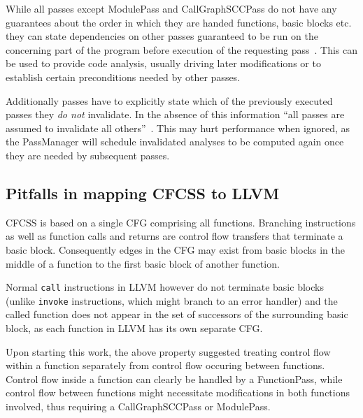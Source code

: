 While all passes except ModulePass and
CallGraphSCCPass do not have any guarantees about the order in which they are
handed functions, basic blocks etc. they can state dependencies on other passes
guaranteed to be run on the concerning part of the program before execution of
the requesting pass~\cite[Specifying interactions between
passes]{writing-passes}. This can be used to provide code analysis, usually
driving later modifications or to establish certain preconditions needed by
other passes.

Additionally passes have to explicitly state which of the previously executed
passes they \emph{do not} invalidate. In the absence of this information “all
passes are assumed to invalidate all others”~\cite[Specifying interactions
between passes]{writing-passes}. This may hurt performance when ignored, as the
PassManager will schedule invalidated analyses to be computed again once they
are needed by subsequent passes.


\subsection{Pitfalls in mapping CFCSS to LLVM}

CFCSS is based on a single CFG comprising all functions. Branching instructions
as well as function calls and returns are control flow transfers that terminate
a basic block. Consequently edges in the CFG may exist from basic blocks in the
middle of a function to the first basic block of another function.

Normal \texttt{call} instructions in LLVM however do not terminate basic
blocks~\cite{terminatorinst} (unlike \texttt{invoke} instructions, which might branch to an
error handler) and the called function does not appear in the set of successors
of the surrounding basic block, as each function in LLVM has its own separate
CFG.

 Upon starting this
work, the above property suggested treating control flow
within a function separately from control flow occuring between functions.
Control flow inside a function can clearly be handled by a FunctionPass, while
control flow between functions might necessitate modifications in both
functions involved, thus requiring a CallGraphSCCPass or ModulePass.
